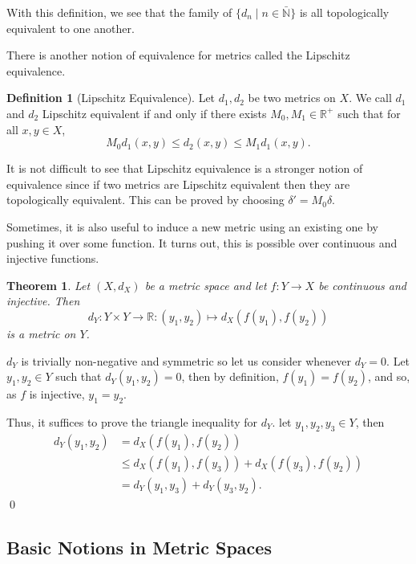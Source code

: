 \documentclass[
]{article}
\newtheorem{theorem}{Theorem}
\theoremstyle{definition}
\newtheorem{definition}{Definition}[section]
\begin{document}
With this definition, we see that the family of
\(\{d_n \mid n \in \bar{\mathbb{N}}\}\) is all topologically equivalent
to one another.

There is another notion of equivalence for metrics called the Lipschitz
equivalence.

\begin{definition}[Lipschitz Equivalence]
  Let \(d_1, d_2\) be two metrics on \(X\). We call \(d_1\) and \(d_2\) 
  Lipschitz equivalent if and only if there exists \(M_0, M_1 \in \mathbb{R}^+\) 
  such that for all \(x, y \in X\),
  \[M_0 d_1(x, y) \le d_2(x, y) \le M_1 d_1(x, y).\] 
\end{definition}

It is not difficult to see that Lipschitz equivalence is a stronger
notion of equivalence since if two metrics are Lipschitz equivalent then
they are topologically equivalent. This can be proved by choosing
\(\delta' = M_0\delta\).

Sometimes, it is also useful to induce a new metric using an existing
one by pushing it over some function. It turns out, this is possible
over continuous and injective functions.

\begin{theorem}\label{induce_metric}
  Let \((X, d_X)\) be a metric space and let \(f : Y \to X\) be continuous and 
  injective. Then 
  \[d_Y : Y \times Y \to \mathbb{R} : (y_1, y_2) \mapsto d_X(f(y_1), f(y_2))\]
  is a metric on \(Y\).
\end{theorem}
\proof

\(d_Y\) is trivially non-negative and symmetric so let us consider
whenever \(d_Y = 0\). Let \(y_1, y_2 \in Y\) such that
\(d_Y(y_1, y_2) = 0\), then by definition, \(f(y_1) = f(y_2)\), and so,
as \(f\) is injective, \(y_1 = y_2\).

Thus, it suffices to prove the triangle inequality for \(d_Y\). let
\(y_1, y_2, y_3 \in Y\), then \begin{align*}
    d_Y(y_1, y_2) & = d_X(f(y_1), f(y_2)) \\
      & \le d_X(f(y_1), f(y_3)) + d_X(f(y_3), f(y_2))\\
      & = d_Y(y_1, y_3) + d_Y(y_3, y_2).
  \end{align*} \qed

\hypertarget{basic-notions-in-metric-spaces}{%
\subsection{Basic Notions in Metric
Spaces}\label{basic-notions-in-metric-spaces}}
\end{document}
